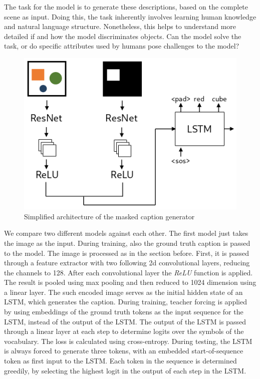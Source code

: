 The task for the model is to generate these descriptions, based on the complete scene as input.
Doing this, the task inherently involves learning human knowledge and natural language structure.
Nonetheless, this helps to understand more detailed if and how the model discriminates objects.
Can the model solve the task, or do specific attributes used by humans pose challenges to the model?

\begin{figure}[ht]
    \centering
    \includegraphics[width=.5\linewidth]{figures/arch_caption_generator.png}
    \caption{Simplified architecture of the masked caption generator}
    \label{fig:caption_generator_architecture}
\end{figure}

We compare two different models against each other.
The first model just takes the image as the input.
During training, also the ground truth caption is passed to the model.
The image is processed as in the section before.
First, it is passed through a feature extractor with two following 2d convolutional layers, reducing the channels to 128.
After each convolutional layer the \emph{ReLU} function is applied.
The result is pooled using max pooling and then reduced to 1024 dimension using a linear layer.
The such encoded image serves as the initial hidden state of an LSTM, which generates the caption.
During training, teacher forcing is applied by using embeddings of the ground truth tokens as the input sequence for the LSTM, instead of the output of the LSTM.
The output of the LSTM is passed through a linear layer at each step to determine logits over the symbols of the vocabulary.
The loss is calculated using cross-entropy.
During testing, the LSTM is always forced to generate three tokens, with an embedded start-of-sequence token as first input to the LSTM.
Each token in the sequence is determined greedily, by selecting the highest logit in the output of each step in the LSTM.

